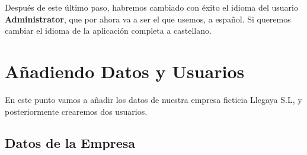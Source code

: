 Después de este último paso, habremos cambiado con éxito el idioma del usuario \textbf{Administrator}, que por ahora va a ser el que usemos, a español. Si queremos cambiar el idioma de la aplicación completa a castellano.

\section{Añadiendo Datos y Usuarios}

En este punto vamos a añadir los datos de nuestra empresa ficticia Llegaya S.L, y posteriormente crearemos dos usuarios.

\subsection{Datos de la Empresa}














\newpage



